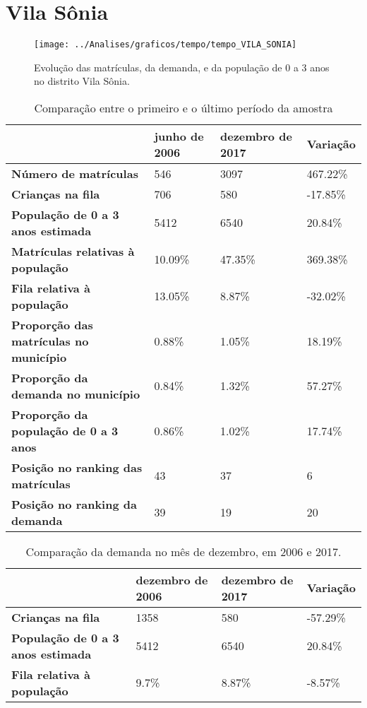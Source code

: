 \section{Vila Sônia}
\begin{figure}[H]
\centering
\texttt{[image: ../Analises/graficos/tempo/tempo\_VILA\_SONIA]}
\caption{Evolução das matrículas, da demanda, e da população de 0 a 3 anos no distrito Vila Sônia.}
\end{figure}
\begin{table}[H]
\begin{tabular}{|l|l|l|l|}
\hline
\textbf{}                                      & \textbf{junho de 2006}       & \textbf{dezembro de 2017}    & \textbf{Variação} \\ \hline
\textbf{Número de matrículas}                  & 546 & 3097 & 467.22\% \\ \hline
\textbf{Crianças na fila}                      & 706 & 580 & -17.85\% \\ \hline
\textbf{População de 0 a 3 anos estimada}      & 5412 & 6540 & 20.84\% \\ \hline
\textbf{Matrículas relativas à população}      & 10.09\% & 47.35\% & 369.38\% \\ \hline
\textbf{Fila relativa à população}             & 13.05\% & 8.87\% & -32.02\% \\ \hline
\textbf{Proporção das matrículas no município} & 0.88\% & 1.05\% & 18.19\% \\ \hline
\textbf{Proporção da demanda no município}     & 0.84\% & 1.32\% & 57.27\% \\ \hline
\textbf{Proporção da população de 0 a 3 anos}  & 0.86\% & 1.02\% & 17.74\% \\ \hline
\textbf{Posição no ranking das matrículas}     & 43 & 37 & 6 \\ \hline
\textbf{Posição no ranking da demanda}         & 39 & 19 & 20 \\ \hline
\end{tabular}
\caption{Comparação entre o primeiro e o último período da amostra}
\end{table}
\begin{table}[H]
\begin{tabular}{|l|l|l|l|}
\hline
\textbf{}                                 & \textbf{dezembro de 2006} & \textbf{dezembro de 2017} & \textbf{Variação} \\ \hline
\textbf{Crianças na fila}                      & 1358 & 580 & -57.29\% \\ \hline
\textbf{População de 0 a 3 anos estimada}      & 5412 & 6540 & 20.84\% \\ \hline
\textbf{Fila relativa à população}             & 9.7\% & 8.87\% & -8.57\% \\ \hline
\end{tabular}
\caption{Comparação da demanda no mês de dezembro, em 2006 e 2017.}
\end{table}